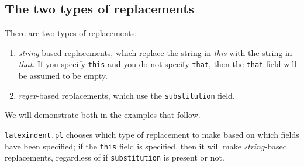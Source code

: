 \subsection{The two types of replacements}
 There are two types of replacements:
 \begin{enumerate}
  \item \emph{string}-based replacements, which replace the string in
        \emph{this} with the string in \emph{that}.
        If you specify \texttt{this} and you do not specify \texttt{that}, then the \texttt{that}
        field will be assumed to be empty.
  \item \emph{regex}-based replacements, which use the \texttt{substitution} field.
 \end{enumerate}
 We will demonstrate both in the examples that follow.

 \texttt{latexindent.pl} chooses which type of replacement to make based on which fields
 have been specified; if the \texttt{this} field is specified, then it will make
 \emph{string}-based replacements, regardless of if \texttt{substitution} is present or
 not.

